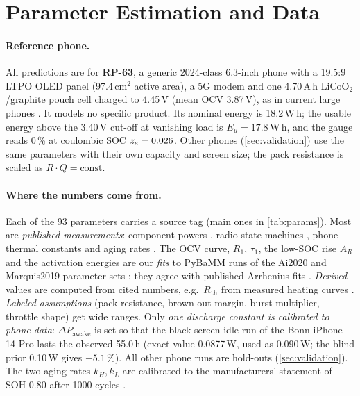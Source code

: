 \section{Parameter Estimation and Data}\label{sec:params}

\paragraph{Reference phone.} All predictions are for \textbf{RP-63}, a generic 2024-class 6.3-inch phone with a
19.5:9 LTPO OLED panel (97.4\,cm$^2$ active area), a 5G modem and one 4.70\,A\,h LiCoO$_2$/graphite pouch cell
charged to 4.45\,V (mean OCV 3.87\,V), as in current large phones \cite{PIX9,MR24}. It models no specific product.
Its nominal energy is 18.2\,W\,h; the usable energy above the 3.40\,V cut-off at vanishing load is
$E_u=17.8$\,W\,h, and the gauge reads 0\,\% at coulombic SOC $z_e=0.026$. Other phones (\cref{sec:validation})
use the same parameters with their own capacity and screen size; the pack resistance is scaled as
$R\cdot Q=\text{const}$.

\begin{table}[t]
\centering
\caption{Main RP-63 parameters (powers at the battery terminals; resistances at 25\,$^\circ$C). UQ range: prior
for uncertainty quantification, U uniform, LU log-uniform, T triangular with the value as mode. Source: fit = our
fit; der. = derived from cited numbers; assum. = labeled assumption; \textbf{cal.} = calibrated
($\Delta P_{\mathrm{awake}}$ to one phone run, $k_H,k_L$ to the 1000-cycle rating). Wi-Fi and 5G share the LTE
radio structure with their own values (e.g.\ active power 0.13 and 0.90\,W, tail power 0.12 and 0.255\,W).}
\label{tab:params}

\end{table}

\paragraph{Where the numbers come from.} Each of the 93 parameters carries a source tag (main ones in
\cref{tab:params}). Most
are \emph{published measurements}: component powers \cite{CH13,CH10,GU24,KW19}, radio state machines
\cite{HU12,NA21}, phone thermal constants \cite{HE19,KANG19,PU23} and aging rates \cite{SCH14,KEIL16}. The OCV
curve, $R_1$, $\tau_1$, the low-SOC rise $A_R$ and the activation energies are our \emph{fits} to PyBaMM \cite{SULZER21} runs of the Ai2020 and Marquis2019 parameter sets \cite{AI20,MQ19}; they agree with published Arrhenius
fits \cite{BARC22,SUN23}. \emph{Derived} values are computed from cited numbers, e.g.\ $R_{\mathrm{th}}$ from
measured heating curves \cite{HE19}. \emph{Labeled assumptions} (pack resistance, brown-out margin, burst
multiplier, throttle shape) get wide ranges. Only \emph{one discharge constant is calibrated to phone data}:
$\Delta P_{\mathrm{awake}}$ is set so that the black-screen idle run of the Bonn iPhone 14 Pro \cite{BONN26} lasts
the observed 55.0\,h (exact value 0.0877\,W, used as 0.090\,W; the blind prior 0.10\,W gives $-5.1$\,\%). All
other phone runs are hold-outs (\cref{sec:validation}). The two aging rates $k_H,k_L$ are calibrated to the
manufacturers' statement of SOH 0.80 after 1000 cycles \cite{AP-BATT,GOOG}.

